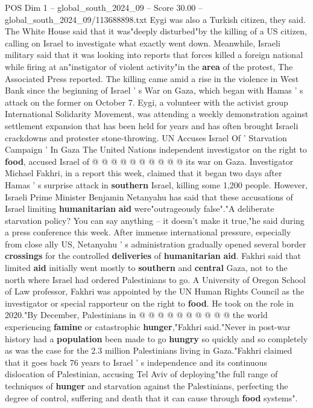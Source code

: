 \begin{textsample}{POS Dim 1 – global\_south\_2024\_09 – Score 30.00 – global\_south\_2024\_09/113688898.txt}
Eygi was also a Turkish citizen, they said.
The White House said that it was"deeply disturbed"by the killing of a US citizen, calling on Israel to investigate what exactly went down.
Meanwhile, Israeli military said that it was looking into reports that forces killed a foreign national while firing at an"instigator of violent activity"in the \textbf{area} of the protest, The Associated Press reported.
The killing came amid a rise in the violence in West Bank since the beginning of Israel ' s War on Gaza, which began with Hamas ' s attack on the former on October 7.
Eygi, a volunteer with the activist group International Solidarity Movement, was attending a weekly demonstration against settlement expansion that has been held for years and has often brought Israeli crackdowns and protester stone-throwing.
UN Accuses Israel Of ' Starvation Campaign ' In Gaza The United Nations independent investigator on the right to \textbf{food}, accused Israel of @ @ @ @ @ @ @ @ @ @ its war on Gaza.
Investigator Michael Fakhri, in a report this week, claimed that it began two days after Hamas ' s surprise attack in \textbf{southern} Israel, killing some 1,200 people.
However, Israeli Prime Minister Benjamin Netanyahu has said that these accusations of Israel limiting \textbf{humanitarian} \textbf{aid} were"outrageously false"."A deliberate starvation policy?
You can say anything -- it doesn't make it true,"he said during a press conference this week.
After immense international pressure, especially from close ally US, Netanyahu ' s administration gradually opened several border \textbf{crossings} for the controlled \textbf{deliveries} of \textbf{humanitarian} \textbf{aid}.
Fakhri said that limited \textbf{aid} initially went mostly to \textbf{southern} and \textbf{central} Gaza, not to the north where Israel had ordered Palestinians to go.
A University of Oregon School of Law professor, Fakhri was appointed by the UN Human Rights Council as the investigator or special rapporteur on the right to \textbf{food}.
He took on the role in 2020."By December, Palestinians in @ @ @ @ @ @ @ @ @ @ the world experiencing \textbf{famine} or catastrophic \textbf{hunger},"Fakhri said."Never in post-war history had a \textbf{population} been made to go \textbf{hungry} so quickly and so completely as was the case for the 2.3 million Palestinians living in Gaza."Fakhri claimed that it goes back 76 years to Israel ' s independence and its continuous dislocation of Palestinian, accusing Tel Aviv of deploying"the full range of techniques of \textbf{hunger} and starvation against the Palestinians, perfecting the degree of control, suffering and death that it can cause through \textbf{food} systems".

\end{textsample}

